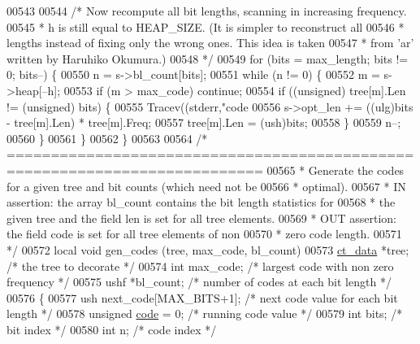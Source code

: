 \begin{DoxyCode}
{{{{{{{{{00543 
00544     \textcolor{comment}{/* Now recompute all bit lengths, scanning in increasing frequency.}
00545 \textcolor{comment}{     * h is still equal to HEAP\_SIZE. (It is simpler to reconstruct all}
00546 \textcolor{comment}{     * lengths instead of fixing only the wrong ones. This idea is taken}
00547 \textcolor{comment}{     * from 'ar' written by Haruhiko Okumura.)}
00548 \textcolor{comment}{     */}
00549     \textcolor{keywordflow}{for} (bits = max\_length; bits != 0; bits--) \{
00550         n = s->bl\_count[bits];
00551         \textcolor{keywordflow}{while} (n != 0) \{
00552             m = s->heap[--h];
00553             \textcolor{keywordflow}{if} (m > max\_code) \textcolor{keywordflow}{continue};
00554             \textcolor{keywordflow}{if} ((\textcolor{keywordtype}{unsigned}) tree[m].Len != (\textcolor{keywordtype}{unsigned}) bits) \{
00555                 Tracev((stderr,\textcolor{stringliteral}{"code %
00556                 s->opt\_len += ((ulg)bits - tree[m].Len) * tree[m].Freq;
00557                 tree[m].Len = (ush)bits;
00558             \}
00559             n--;
00560         \}
00561     \}
00562 \}
00563 
00564 \textcolor{comment}{/* ===========================================================================}
00565 \textcolor{comment}{ * Generate the codes for a given tree and bit counts (which need not be}
00566 \textcolor{comment}{ * optimal).}
00567 \textcolor{comment}{ * IN assertion: the array bl\_count contains the bit length statistics for}
00568 \textcolor{comment}{ * the given tree and the field len is set for all tree elements.}
00569 \textcolor{comment}{ * OUT assertion: the field code is set for all tree elements of non}
00570 \textcolor{comment}{ *     zero code length.}
00571 \textcolor{comment}{ */}
00572 local \textcolor{keywordtype}{void} gen\_codes (tree, max\_code, bl\_count)
00573     \hyperlink{structct__data__s}{ct\_data} *tree;             \textcolor{comment}{/* the tree to decorate */}
00574     \textcolor{keywordtype}{int} max\_code;              \textcolor{comment}{/* largest code with non zero frequency */}
00575     ushf *bl\_count;            \textcolor{comment}{/* number of codes at each bit length */}
00576 \{
00577     ush next\_code[MAX\_BITS+1]; \textcolor{comment}{/* next code value for each bit length */}
00578     \textcolor{keywordtype}{unsigned} \hyperlink{structcode}{code} = 0;         \textcolor{comment}{/* running code value */}
00579     \textcolor{keywordtype}{int} bits;                  \textcolor{comment}{/* bit index */}
00580     \textcolor{keywordtype}{int} n;                     \textcolor{comment}{/* code index */}
}}}}}}}}}}
\end{DoxyCode}
